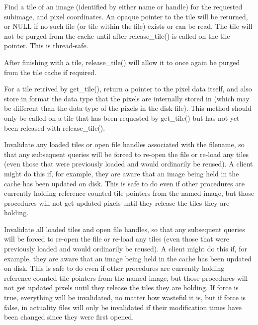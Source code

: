 Find a tile of an image (identified by either name or handle)
for the requested {\cf subimage}, and pixel
coordinates.  An opaque pointer to the tile will be returned,
or {\cf NULL} if no such file (or tile within the file) exists or can
be read.  The tile will not be purged from the cache until 
after {\cf release_tile()} is called on the tile pointer.  This is
thread-safe.
\apiend

After finishing with a tile, {\cf release_tile()} will allow it to 
once again be purged from the tile cache if required.
\apiend

For a tile retrived by {\cf get_tile()}, return a pointer to the
pixel data itself, and also store in {\cf format} the data type that
the pixels are internally stored in (which may be different than
the data type of the pixels in the disk file).  This method should
only be called on a tile that has been requested by 
{\cf get_tile()} but has not yet been released with {\cf release_tile()}.
\apiend

Invalidate any loaded tiles or open file handles associated with
the filename, so that any subsequent queries will be forced to
re-open the file or re-load any tiles (even those that were
previously loaded and would ordinarily be reused).  A client
might do this if, for example, they are aware that an image
being held in the cache has been updated on disk.  This is safe
to do even if other procedures are currently holding 
reference-counted tile pointers from the named image, but those 
procedures will not get updated pixels until they release the 
tiles they are holding.
\apiend

Invalidate all loaded tiles and open file handles, so that any
subsequent queries will be forced to re-open the file or re-load any
tiles (even those that were previously loaded and would ordinarily be
reused).  A client might do this if, for example, they are aware that an
image being held in the cache has been updated on disk.  This is safe to
do even if other procedures are currently holding reference-counted tile
pointers from the named image, but those procedures will not get updated
pixels until they release the tiles they are holding.  If force is true,
everything will be invalidated, no matter how wasteful it is, but if
force is false, in actuality files will only be invalidated if their
modification times have been changed since they were first opened.
\apiend

